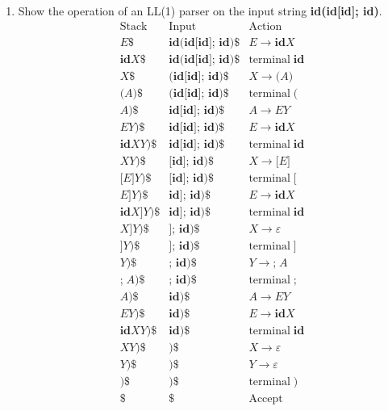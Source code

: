 \documentclass[11pt]{article}
\begin{document}
\begin{enumerate}
\begin{enumerate}
\item Show the operation of an LL(1) parser on the input string
\textbf{id(id[id]; id)}.
\[
\begin{array}{lll}
\mathrm{Stack} & \mathrm{Input} & \mathrm{Action} \\
\hline
E \textbf{\$} & \textbf{id(id[id]; id)\$}
& E \rightarrow \mathbf{id} X \\
\mathbf{id} X \textbf{\$} & \textbf{id(id[id]; id)\$}
& \mathrm{terminal} \; \mathbf{id} \\
X \textbf{\$} & \textbf{(id[id]; id)\$}
& X \rightarrow \textbf{(} A \textbf{)} \\
\textbf{(} A \textbf{)} \textbf{\$} & \textbf{(id[id]; id)\$}
& \mathrm{terminal} \; \textbf{(} \\
A \textbf{)} \textbf{\$} & \textbf{id[id]; id)\$}
& A \rightarrow EY \\
EY \textbf{)} \textbf{\$} & \textbf{id[id]; id)\$}
& E \rightarrow \mathbf{id} X \\
\mathbf{id} XY \textbf{)} \textbf{\$} & \textbf{id[id]; id)\$}
& \mathrm{terminal} \; \mathbf{id} \\
XY \textbf{)} \textbf{\$} & \textbf{[id]; id)\$}
& X \rightarrow \textbf{[} E \textbf{]} \\
\textbf{[} E \textbf{]} Y \textbf{)} \textbf{\$}
& \textbf{[id]; id)\$} & \mathrm{terminal} \; \textbf{[} \\
E \textbf{]} Y \textbf{)} \textbf{\$} & \textbf{id]; id)\$}
& E \rightarrow \mathbf{id} X \\
\mathbf{id} X \textbf{]} Y \textbf{)} \textbf{\$}
& \textbf{id]; id)\$} & \mathrm{terminal} \; \mathbf{id} \\
X \textbf{]} Y \textbf{)} \textbf{\$} & \textbf{]; id)\$}
& X \rightarrow \varepsilon \\
\textbf{]} Y \textbf{)} \textbf{\$} & \textbf{]; id)\$}
& \mathrm{terminal} \; \textbf{]} \\
Y \textbf{)} \textbf{\$} & \textbf{; id)\$}
& Y \rightarrow \textbf{;} \; A \\
\textbf{;} \; A \textbf{)} \textbf{\$} & \textbf{; id)\$}
& \mathrm{terminal} \; \textbf{;} \\
A \textbf{)} \textbf{\$} & \textbf{id)\$} & A \rightarrow EY \\
EY \textbf{)} \textbf{\$} & \textbf{id)\$}
& E \rightarrow \mathbf{id} X \\
\mathbf{id} XY \textbf{)} \textbf{\$} & \textbf{id)\$}
& \mathrm{terminal} \; \mathbf{id} \\
XY \textbf{)} \textbf{\$} & \textbf{)\$}
& X \rightarrow \varepsilon \\
Y \textbf{)} \textbf{\$} & \textbf{)\$}
& Y \rightarrow \varepsilon \\
\textbf{)} \textbf{\$} & \textbf{)\$}
& \mathrm{terminal} \; \textbf{)} \\
\textbf{\$} & \textbf{\$} & \mathrm{Accept}
\end{array}
\]


\end{enumerate}
\end{enumerate}
\end{document}

